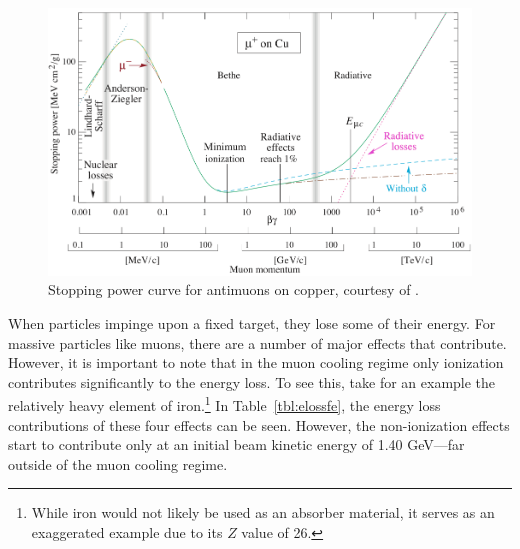 \begin{figure}
  \centering
    \includegraphics[width=\textwidth]{Figures/bethecurve} 
  \caption[Stopping power curve for antimuons on copper.]{Stopping power curve for antimuons on copper, courtesy of \cite{PDG}. }
  \label{fig:bethecurve}
\end{figure}

When particles impinge upon a fixed target, they lose some of their energy. For massive particles like muons, there are a number of major effects that contribute. However, it is important to note that in the muon cooling regime only ionization contributes significantly to the energy loss. To see this, take for an example the relatively heavy element of iron.\footnote{While iron would not likely be used as an absorber material, it serves as an exaggerated example due to its $Z$ value of 26.} In Table~\ref{tbl:elossfe}, the energy loss contributions of these four effects can be seen. However, the non-ionization effects start to contribute only at an initial beam kinetic energy of 1.40 GeV---far outside of the muon cooling regime.


